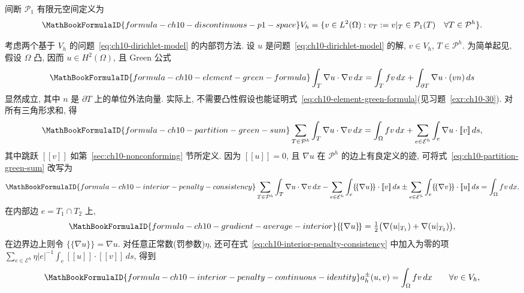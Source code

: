 间断 $\mathcal P_1$ 有限元空间定义为
\begin{equation}
\MathBookFormulaID{formula-ch10-discontinuous-p1-space}
\label{eq:ch10-discontinuous-p1-space}
V_h=\{v\in L^2(\Omega):v_T:=v|_T\in\mathcal P_1(T)
\quad\forall T\in\mathcal P^h\}.
\end{equation}

考虑两个基于 $V_h$ 的问题~\eqref{eq:ch10-dirichlet-model} 的内部罚方法. 设 $u$ 是问题~\eqref{eq:ch10-dirichlet-model} 的解, $v\in V_h$, $T\in\mathcal P^h$. 为简单起见, 假设 $\Omega$ 凸, 因而 $u\in H^2(\Omega)$, 且 Green 公式
\begin{equation}
\MathBookFormulaID{formula-ch10-element-green-formula}
\label{eq:ch10-element-green-formula}
\int_T\nabla u\cdot\nabla v\,dx
=\int_Tfv\,dx+\int_{\partial T}\nabla u\cdot(vn)\,ds
\end{equation}
显然成立, 其中 $n$ 是 $\partial T$ 上的单位外法向量. 实际上, 不需要凸性假设也能证明式~\eqref{eq:ch10-element-green-formula}(见习题~\ref{exr:ch10-30}). 对所有三角形求和, 得
\begin{equation}
\MathBookFormulaID{formula-ch10-partition-green-sum}
\label{eq:ch10-partition-green-sum}
\sum_{T\in\mathcal P^h}\int_T\nabla u\cdot\nabla v\,dx
=\int_\Omega fv\,dx+\sum_{e\in\mathcal E^h}\int_e\nabla u\cdot[\![v]\!]\,ds,
\end{equation}
其中跳跃 $[\![v]\!]$ 如第~\ref{sec:ch10-nonconforming} 节所定义. 因为 $[\![u]\!]=0$, 且 $\nabla u$ 在 $\mathcal P^h$ 的边上有良定义的迹, 可将式~\eqref{eq:ch10-partition-green-sum} 改写为
\begin{equation}
\MathBookFormulaID{formula-ch10-interior-penalty-consistency}
\label{eq:ch10-interior-penalty-consistency}
\sum_{T\in\mathcal P^h}\int_T\nabla u\cdot\nabla v\,dx
-\sum_{e\in\mathcal E^h}\int_e\{\!\{\nabla u\}\!\}\cdot[\![v]\!]\,ds
\mathbin{\pm}\sum_{e\in\mathcal E^h}\int_e\{\!\{\nabla v\}\!\}\cdot[\![u]\!]\,ds
=\int_\Omega fv\,dx.
\end{equation}
在内部边 $e=T_1\cap T_2$ 上,
\[
\MathBookFormulaID{formula-ch10-gradient-average-interior}
\{\!\{\nabla u\}\!\}=\tfrac12\bigl(\nabla(u|_{T_1})+\nabla(u|_{T_2})\bigr),
\]
在边界边上则令 $\{\!\{\nabla u\}\!\}=\nabla u$. 对任意正常数(罚参数)$\eta$, 还可在式~\eqref{eq:ch10-interior-penalty-consistency} 中加入为零的项 $\sum_{e\in\mathcal E^h}\eta|e|^{-1}\int_e[\![u]\!]\cdot[\![v]\!]\,ds$, 得到
\begin{equation}
\MathBookFormulaID{formula-ch10-interior-penalty-continuous-identity}
\label{eq:ch10-interior-penalty-continuous-identity}
a_h^\pm(u,v)=\int_\Omega fv\,dx\qquad\forall v\in V_h,
\end{equation}
